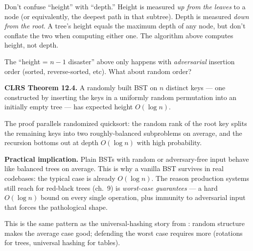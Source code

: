 \documentclass[11pt]{article}
\begin{document}
\begin{warnbox}
Don't confuse ``height'' with ``depth.'' Height is measured \emph{up from the leaves} to a node (or equivalently, the deepest path in that subtree). Depth is measured \emph{down from the root}. A tree's height equals the maximum depth of any node, but don't conflate the two when computing either one. The algorithm above computes height, not depth.
\end{warnbox}

\begin{notebox}
The ``height = $n - 1$ disaster'' above only happens with
\emph{adversarial} insertion order (sorted, reverse-sorted, etc).
What about random order?

\textbf{CLRS Theorem 12.4.} A randomly built BST on $n$ distinct
keys --- one constructed by inserting the keys in a uniformly random
permutation into an initially empty tree --- has expected height
$O(\log n)$.

The proof parallels randomized quicksort: the random rank of the
root key splits the remaining keys into two roughly-balanced
subproblems on average, and the recursion bottoms out at depth
$O(\log n)$ with high probability.

\textbf{Practical implication.} Plain BSTs with random or
adversary-free input behave like balanced trees on average. This is
why a vanilla BST survives in real codebases: the typical case is
already $O(\log n)$. The reason production systems still reach for
red-black trees (ch.~9) is \emph{worst-case guarantees} --- a hard
$O(\log n)$ bound on every single operation, plus immunity to
adversarial input that forces the pathological shape.

This is the same pattern as the universal-hashing story from
: random structure makes the average case good;
defending the worst case requires more (rotations for trees,
universal hashing for tables).
\end{notebox}
\end{document}
